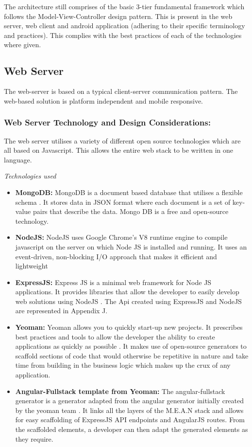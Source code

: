 \documentclass[12pt]{witseiepaper}
\begin{document}
The architecture still comprises of the basic 3-tier fundamental framework which follows the Model-View-Controller design pattern. This is present in the web server, web client and android application (adhering to their specific terminology and practices). This complies with the best practices of each of the technologies where given.


\subsection{Web Server}
The web-server is based on a typical client-server communication pattern. The web-based solution is platform independent and mobile responsive.
\subsubsection{Web Server Technology and Design Considerations:} 
The web server utilises a variety of different open source technologies which are all based on Javascript. This allows the entire web stack to be written in one language.

\textit{Technologies used}
\begin{itemize}
  \item \textbf{MongoDB:} MongoDB is a document based database that utilises a flexible schema \cite{MongoDB}. It stores data in JSON format where each document is a set of key-value pairs that describe the data. Mongo DB is a free and open-source technology.
  \item \textbf{NodeJS:} NodeJS uses Google Chrome's V8 runtime engine to compile javascript on the server on which Node JS is installed and running. It uses an event-driven, non-blocking I/O approach that makes it efficient and lightweight \cite{NodeJS}
  \item \textbf{ExpressJS:} Express JS is a minimal web framework for Node JS applications. It provides libraries that allow the developer to easily develop web solutions using NodeJS \cite{ExpressJS}. The Api created using ExpressJS and NodeJS are represented in Appendix J.
  \item \textbf{Yeoman:} Yeoman allows you to quickly start-up new projects. It prescribes best practices and tools to allow the developer the ability to create applications as quickly as possible \cite{Yeoman}. It makes use of open-source generators to scaffold sections of code that would otherwise be repetitive in nature and take time from building in the business logic which makes up the crux of any application.
  \item \textbf{Angular-Fullstack template from Yeoman:} The angular-fullstack generator is a generator adapted from the angular generator initially created by the yeoman team \cite{AngularFullstack}. It links all the layers of the M.E.A.N stack and allows for easy scaffolding of ExpressJS API endpoints and AngularJS routes. From the scaffolded elements, a developer can then adapt the generated elements as they require.
\end{itemize}
\end{document}
